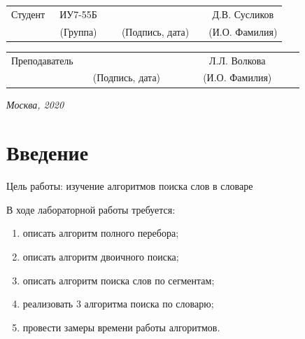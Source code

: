 \documentclass[14pt, a4paper]{extarticle}
\begin{document}
	
	\noindent
	\\
	
	\noindent
	\\
	
	\vspace{1.5cm}
	\noindent
	\begin{tabular}{l c c c c c}
		Студент      & ~ИУ7-55Б~               & \hspace{2.5cm} & \hspace{2cm}                 & &  Д.В. Сусликов \\\cline{2-2}\cline{4-4} \cline{6-6} 
		\hspace{3cm} & {\footnotesize(Группа)} &                & {\footnotesize(Подпись, дата)} & & {\footnotesize(И.О. Фамилия)}
	\end{tabular}
	
	\noindent
	\begin{tabular}{l c c c c}
		Преподаватель & \hspace{5cm}   & \hspace{2cm}                 & & ~~~~~~Л.Л. Волкова~~~~~~\\\cline{3-3} \cline{5-5} 
		\hspace{3cm}  &                & {\footnotesize(Подпись, дата)} & & {\footnotesize(И.О. Фамилия)}
	\end{tabular}
	
	\vspace{0.6cm}
	\begin{center}	
		\vfill
		\large \textit {Москва, 2020}
	\end{center}
	
	\thispagestyle {empty}
	\pagebreak
	
	\clearpage
	\tableofcontents
	
	\clearpage
	\section*{Введение}
	Цель работы: изучение алгоритмов поиска слов в словаре\par
	В ходе лабораторной работы требуется:
	\begin{enumerate}
		\item[1)] описать алгоритм полного перебора;
		\item[2)] описать алгоритм двоичного поиска;
		\item[3)] описать алгоритм поиска слов по сегментам;
		\item[4)] реализовать 3 алгоритма поиска по словарю;
		\item[5)] провести замеры времени работы алгоритмов.
	\end{enumerate}\par
	
\end{document}
